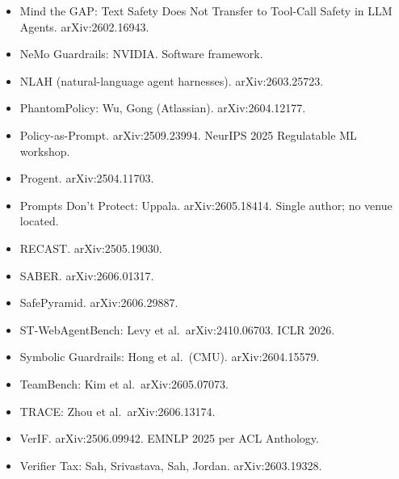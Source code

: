 \documentclass[
]{article}
\begin{document}
\begin{itemize}
\item
  Mind the GAP: Text Safety Does Not Transfer to Tool-Call Safety in LLM
  Agents. arXiv:2602.16943.
\item
  NeMo Guardrails: NVIDIA. Software framework.
\item
  NLAH (natural-language agent harnesses). arXiv:2603.25723.
\item
  PhantomPolicy: Wu, Gong (Atlassian). arXiv:2604.12177.
\item
  Policy-as-Prompt. arXiv:2509.23994. NeurIPS 2025 Regulatable ML
  workshop.
\item
  Progent. arXiv:2504.11703.
\item
  Prompts Don't Protect: Uppala. arXiv:2605.18414. Single author; no
  venue located.
\item
  RECAST. arXiv:2505.19030.
\item
  SABER. arXiv:2606.01317.
\item
  SafePyramid. arXiv:2606.29887.
\item
  ST-WebAgentBench: Levy et al.~arXiv:2410.06703. ICLR 2026.
\item
  Symbolic Guardrails: Hong et al.~(CMU). arXiv:2604.15579.
\item
  TeamBench: Kim et al.~arXiv:2605.07073.
\item
  TRACE: Zhou et al.~arXiv:2606.13174.
\item
  VerIF. arXiv:2506.09942. EMNLP 2025 per ACL Anthology.
\item
  Verifier Tax: Sah, Srivastava, Sah, Jordan. arXiv:2603.19328.
\end{itemize}
\end{document}
